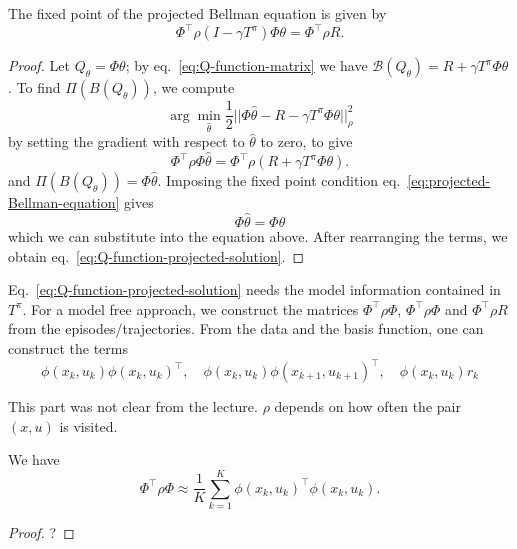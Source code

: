\begin{theorem}
  The fixed point of the projected Bellman equation is given by
  \begin{equation}
    \label{eq:Q-function-projected-solution}
    \Phi^\top \rho \left(I - \gamma T^\pi\right) \Phi\theta = \Phi^\top\rho R.
  \end{equation}
\end{theorem}
\begin{proof}
  Let $Q_\theta = \Phi \theta$; by eq.~\eqref{eq:Q-function-matrix} we have $\mathcal{B}(Q_\theta) = R + \gamma T^\pi\Phi\theta$. To find $\Pi(B(Q_\theta))$, we compute
  \begin{equation*}
    \arg \min_{\hat{\theta}} \frac{1}{2} |\!| \Phi \hat{\theta} - R - \gamma T^\pi \Phi\theta |\!|^2_\rho
  \end{equation*}
  by setting the gradient with respect to $\hat{\theta}$ to zero, to give
  \begin{equation*}
    \Phi^\top\rho\Phi \hat{\theta} = \Phi^\top\rho\left(R + \gamma T^\pi \Phi\theta\right).
  \end{equation*}
  and  $\Pi(B(Q_\theta)) = \Phi\hat{\theta}$. Imposing the fixed point condition eq.~\eqref{eq:projected-Bellman-equation} gives
  \begin{equation*}
    \Phi\hat{\theta} = \Phi\theta
  \end{equation*}
  which we can substitute into the equation above. After rearranging the terms, we obtain eq.~\eqref{eq:Q-function-projected-solution}.
\end{proof}

Eq.~\eqref{eq:Q-function-projected-solution} needs the model information contained in $T^\pi$. For a model free approach, we construct the matrices $\Phi^\top\rho \Phi$, $\Phi^\top\rho \Phi$ and $\Phi^\top\rho R$ from the episodes/trajectories. From the data and the basis function, one can construct the terms
\begin{equation*}
  \phi(x_k,u_k)\phi(x_k,u_k)^\top,\quad \phi(x_k,u_k)\phi(x_{k+1},u_{k+1})^\top,\quad \phi(x_k,u_k)r_k
\end{equation*}

This part was not clear from the lecture. $\rho$ depends on how often the pair $(x,u)$ is visited.

\begin{theorem}
  We have
  \begin{equation*}
    \Phi^\top\rho\Phi \approx \frac{1}{K} \sum_{k=1}^K \phi(x_k,u_k)^\top\phi(x_k,u_k).
  \end{equation*}
\end{theorem}
\begin{proof}
  ?
\end{proof}

